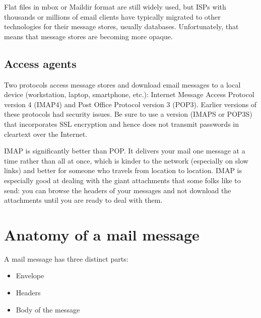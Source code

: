 Flat files in {mbox} or {Maildir} format are still widely used, but ISPs
with thousands or millions of email clients have typically migrated to
other technologies for their message stores, usually databases.
Unfortunately, that means that message stores are becoming more opaque.

\protect\hypertarget{part0026_split_007.html}{}{}

\hypertarget{part0026_split_007.htmlux5cux23_idContainer1247}{}
\hypertarget{part0026_split_007.htmlux5cux23calibre_pb_6}{%
\subsection[Access
agents]{\texorpdfstring{\protect\hypertarget{part0026_split_007.htmlux5cux23_idTextAnchor1009}{}{}Access
agents}{Access agents}}\label{part0026_split_007.htmlux5cux23calibre_pb_6}}

\protect\hypertarget{part0026_split_007.htmlux5cux23_idIndexMarker2419}{}{}\protect\hypertarget{part0026_split_007.htmlux5cux23_idIndexMarker2420}{}{}\protect\hypertarget{part0026_split_007.htmlux5cux23_idIndexMarker2421}{}{}Two
protocols access message stores and download email messages to a local
device (workstation, laptop, smartphone, etc.): Internet Message Access
Protocol {version 4} (IMAP4) and Post Office Protocol version 3 (POP3).
Earlier versions of these protocols had security issues. Be sure to use
a version (IMAPS or POP3S) that incorporates SSL encryption and hence
does not transmit passwords in cleartext over the Internet.

IMAP is significantly better than POP. It delivers your mail one message
at a time rather than all at once, which is kinder to the network
(especially on slow links) and better for someone who travels from
location to location. IMAP is especially good at dealing with the giant
attachments that some folks like to send: you can browse the headers of
your messages and not download the attachments until you are ready to
deal with them.



\section{Anatomy of a mail message}

A mail message has three distinct parts:

\begin{itemize}
\item
  Envelope
\item
  Headers
\item
  Body of the message
\end{itemize}


